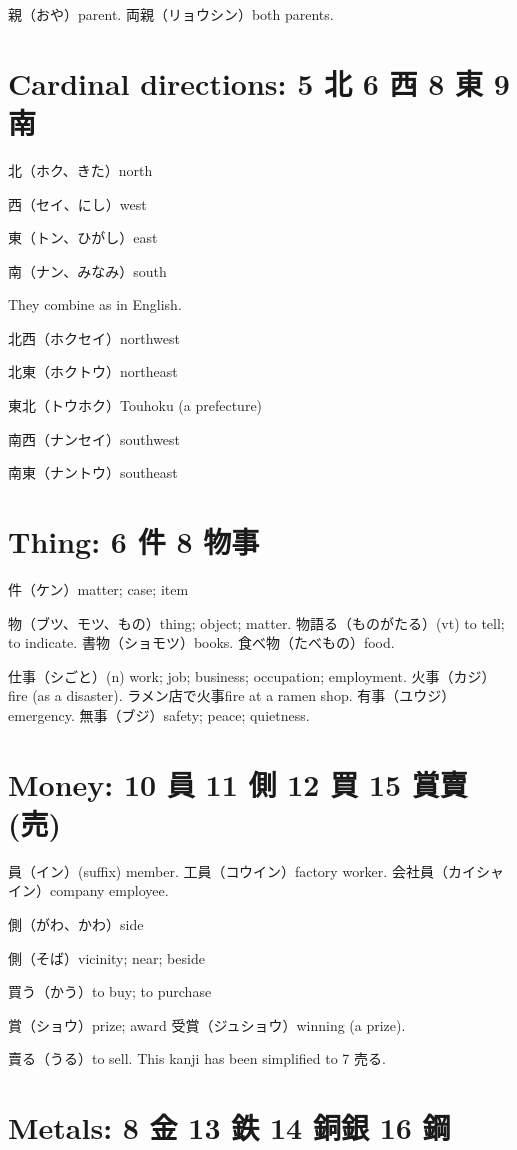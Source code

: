 親（おや）parent.
両親（リョウシン）both parents.

\section{Cardinal directions: 5 北 6 西 8 東 9 南}

北（ホク、きた）north

西（セイ、にし）west

東（トン、ひがし）east

南（ナン、みなみ）south

They combine as in English.

北西（ホクセイ）northwest

北東（ホクトウ）northeast

東北（トウホク）Touhoku (a prefecture)

南西（ナンセイ）southwest

南東（ナントウ）southeast

\section{Thing: 6 件 8 物事}

件（ケン）matter; case; item

物（ブツ、モツ、もの）thing; object; matter.
物語る（ものがたる）(vt) to tell; to indicate.
書物（ショモツ）books.
食べ物（たべもの）food.

仕事（シごと）(n) work; job; business; occupation; employment.
火事（カジ）fire (as a disaster).
ラメン店で火事fire at a ramen shop.
有事（ユウジ）emergency.
無事（ブジ）safety; peace; quietness.

\section{Money: 10 員 11 側 12 買 15 賞賣(売)}

員（イン）(suffix) member.
工員（コウイン）factory worker.
会社員（カイシャイン）company employee.

側（がわ、かわ）side

側（そば）vicinity; near; beside

買う（かう）to buy; to purchase

賞（ショウ）prize; award
受賞（ジュショウ）winning (a prize).

賣る（うる）to sell.
This kanji has been simplified to 7 売る.

\section{Metals: 8 金 13 鉄 14 銅銀 16 鋼}

